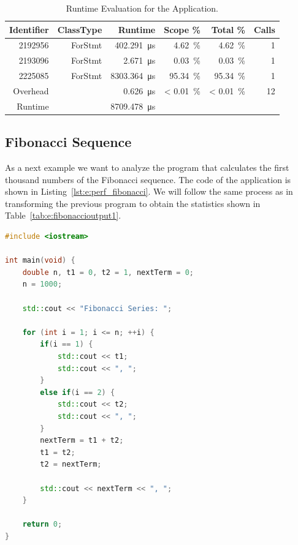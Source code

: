 \begin{table}
  \centering
  \caption{Runtime Evaluation for the \VARYINGLOOP Application.}
  \begin{tabular}{rrrrrr}
    \toprule
    Identifier & ClassType & Runtime                      & Scope \%              & Total \%              & Calls \\
    \midrule
    2192956    & ForStmt   & \SI{402.291}{\micro\second}  & \SI{4.62}{\percent}   & \SI{4.62}{\percent}   & 1     \\
    2193096    & ForStmt   & \SI{2.671}{\micro\second}    & \SI{0.03}{\percent}   & \SI{0.03}{\percent}   & 1     \\
    2225085    & ForStmt   & \SI{8303.364}{\micro\second} & \SI{95.34}{\percent}  & \SI{95.34}{\percent}  & 1     \\
    Overhead   &           & \SI{0.626}{\micro\second}    & < \SI{0.01}{\percent} & < \SI{0.01}{\percent} & 12    \\
    \midrule
    Runtime    &           & \SI{8709.478}{\micro\second} &                       &                       &       \\
    \bottomrule
  \end{tabular}
  \label{tab:e:forloops_output}
\end{table}

\subsection{Fibonacci Sequence}
\label{sectionFibonacciCode}
As a next example we want to analyze the \FIBONACCI program that calculates the first thousand numbers of the Fibonacci sequence. The code of the application is shown in Listing~\ref{lst:e:perf_fibonacci}. We will follow the same process as in transforming the previous program to obtain the statistics shown in Table~\ref{tab:e:fibonaccioutput1}.

\begin{lstlisting}[float, language=C++, caption=\CPP Code Showing the \FIBONACCI Application., label=lst:e:perf_fibonacci]
#include <iostream>

int main(void) {
    double n, t1 = 0, t2 = 1, nextTerm = 0;
    n = 1000;

    std::cout << "Fibonacci Series: ";

    for (int i = 1; i <= n; ++i) {
        if(i == 1) {
            std::cout << t1;
            std::cout << ", ";
        }
        else if(i == 2) {
            std::cout << t2;
            std::cout << ", ";
        }
        nextTerm = t1 + t2;
        t1 = t2;
        t2 = nextTerm;

        std::cout << nextTerm << ", ";
    }

    return 0;
}
\end{lstlisting} 

